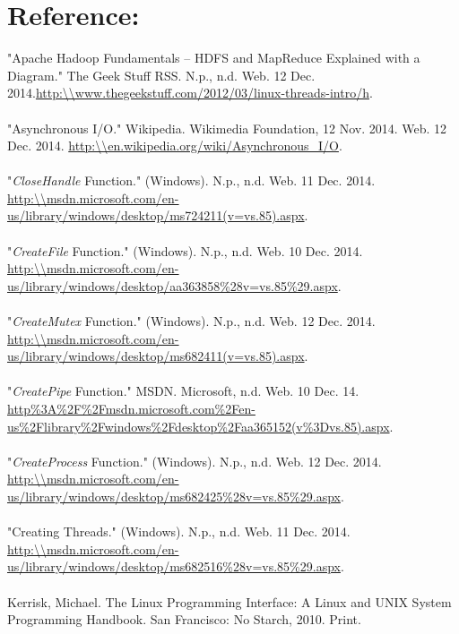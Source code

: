 \documentclass[a4paper]{article}
\begin{document}
\section{Reference:}
"Apache Hadoop Fundamentals – HDFS and MapReduce Explained with a Diagram." The Geek Stuff RSS. N.p., n.d. Web. 12 Dec. 2014.\url{http:\\www.thegeekstuff.com/2012/03/linux-threads-intro/h}.\\
\\
"Asynchronous I/O." Wikipedia. Wikimedia Foundation, 12 Nov. 2014. Web. 12 Dec. 2014. \url{http:\\en.wikipedia.org/wiki/Asynchronous_I/O}.\\
\\
"\textit{CloseHandle} Function." (Windows). N.p., n.d. Web. 11 Dec. 2014. \url{http:\\msdn.microsoft.com/en-us/library/windows/desktop/ms724211(v=vs.85).aspx}.\\
\\
"\textit{CreateFile} Function." (Windows). N.p., n.d. Web. 10 Dec. 2014. \url{http:\\msdn.microsoft.com/en-us/library/windows/desktop/aa363858%28v=vs.85%29.aspx}.\\
\\
"\textit{CreateMutex} Function." (Windows). N.p., n.d. Web. 12 Dec. 2014. \url{http:\\msdn.microsoft.com/en-us/library/windows/desktop/ms682411(v=vs.85).aspx}.\\
\\
"\textit{CreatePipe} Function." MSDN. Microsoft, n.d. Web. 10 Dec. 14. \url{http%3A%2F%2Fmsdn.microsoft.com%2Fen-us%2Flibrary%2Fwindows%2Fdesktop%2Faa365152(v%3Dvs.85).aspx}.\\
\\
"\textit{CreateProcess} Function." (Windows). N.p., n.d. Web. 12 Dec. 2014. \url{http:\\msdn.microsoft.com/en-us/library/windows/desktop/ms682425%28v=vs.85%29.aspx}.\\
\\
"Creating Threads." (Windows). N.p., n.d. Web. 11 Dec. 2014. \url{http:\\msdn.microsoft.com/en-us/library/windows/desktop/ms682516%28v=vs.85%29.aspx}.\\
\\
Kerrisk, Michael. The Linux Programming Interface: A Linux and UNIX System Programming Handbook. San Francisco: No Starch, 2010. Print.\\
\end{document}
